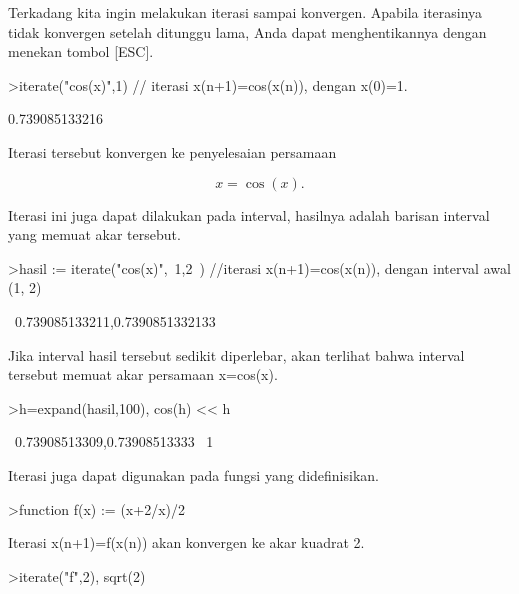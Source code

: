 \documentclass[a4paper,10pt]{article}
\begin{document}
\begin{eulernotebook}
\begin{eulercomment}
\begin{eulercomment}
\begin{eulercomment}
\begin{eulercomment}
\begin{eulercomment}
Terkadang kita ingin melakukan iterasi sampai konvergen. Apabila iterasinya tidak konvergen
setelah ditunggu lama, Anda dapat menghentikannya dengan menekan tombol [ESC].
\end{eulercomment}
\begin{eulerprompt}
>iterate("cos(x)",1) // iterasi x(n+1)=cos(x(n)), dengan x(0)=1.
\end{eulerprompt}
\begin{euleroutput}
  0.739085133216
\end{euleroutput}
\begin{eulercomment}
Iterasi tersebut konvergen ke penyelesaian persamaan

\end{eulercomment}
\begin{eulerformula}
\[
x = \cos(x).
\]
\end{eulerformula}
\begin{eulercomment}
Iterasi ini juga dapat dilakukan pada interval, hasilnya adalah barisan interval yang memuat
akar tersebut.
\end{eulercomment}
\begin{eulerprompt}
>hasil := iterate("cos(x)",~1,2~) //iterasi x(n+1)=cos(x(n)), dengan interval awal (1, 2)
\end{eulerprompt}
\begin{euleroutput}
  ~0.739085133211,0.7390851332133~
\end{euleroutput}
\begin{eulercomment}
Jika interval hasil tersebut sedikit diperlebar, akan terlihat bahwa interval tersebut
memuat akar persamaan x=cos(x).
\end{eulercomment}
\begin{eulerprompt}
>h=expand(hasil,100), cos(h) << h
\end{eulerprompt}
\begin{euleroutput}
  ~0.73908513309,0.73908513333~
  1
\end{euleroutput}
\begin{eulercomment}
Iterasi juga dapat digunakan pada fungsi yang didefinisikan.
\end{eulercomment}
\begin{eulerprompt}
>function f(x) := (x+2/x)/2
\end{eulerprompt}
\begin{eulercomment}
Iterasi x(n+1)=f(x(n)) akan konvergen ke akar kuadrat 2.
\end{eulercomment}
\begin{eulerprompt}
>iterate("f",2), sqrt(2)

\end{eulerprompt}
\end{eulercomment}
\end{eulercomment}
\end{eulercomment}
\end{eulercomment}
\end{eulernotebook}
\end{document}

